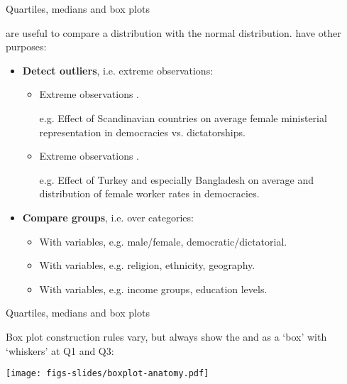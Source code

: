 \documentclass{beamer}
\begin{document}
	\begin{frame}[t]{Quartiles, medians and box plots}

	 are useful to compare a distribution with the normal distribution.  have other purposes:

	\begin{itemize}
		\item \textbf{Detect outliers}, i.e. extreme observations: 
		
		\begin{itemize}
		
			\item Extreme observations .
		
			e.g. Effect of Scandinavian countries on average female ministerial representation in democracies vs. dictatorships.
			
			\item Extreme observations	.

			e.g. Effect of Turkey and especially Bangladesh on average and distribution of female worker rates in democracies.
		
		\end{itemize}
		
		\item \textbf{Compare groups}, i.e. over categories:
		
			\begin{itemize}
				\item With  variables, e.g. male/female, democratic/dictatorial.
				
				\item With  variables, e.g. religion, ethnicity, geography.
				
				\item With  variables, e.g. income groups, education levels.
			\end{itemize}
	\end{itemize}

	\end{frame}


	\begin{frame}[t]{Quartiles, medians and box plots}

	Box plot construction rules vary, but always show the  and  as a `box' with `whiskers' at Q1 and Q3:
	
	\begin{center}
		\texttt{[image: figs-slides/boxplot-anatomy.pdf]}	
	\end{center}

	\end{frame}
\end{document}
